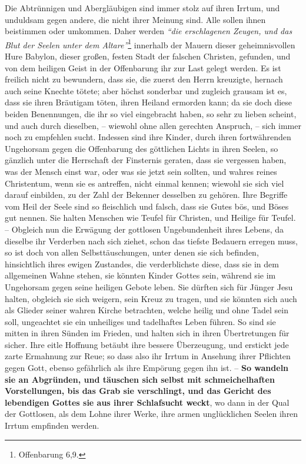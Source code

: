 Die Abtrünnigen und Abergläubigen sind immer stolz auf ihren Irrtum, und
unduldsam gegen andere, die nicht ihrer Meinung sind.
Alle sollen ihnen beistimmen oder umkommen.
Daher werden
\textit{"`die erschlagenen Zeugen, und das Blut der Seelen unter
dem Altare"'}\footnote{Offenbarung 6,9.}
innerhalb der Mauern dieser geheimnisvollen Hure Babylon, dieser großen, festen Stadt
der falschen Christen, gefunden, und von dem heiligen Geist in der Offenbarung
ihr zur Last gelegt werden.
Es ist freilich nicht zu bewundern, dass sie, die zuerst den Herrn kreuzigte,
hernach auch seine Knechte tötete;
aber höchst sonderbar und zugleich grausam ist es, dass sie ihren Bräutigam
töten, ihren Heiland ermorden kann;
da sie doch diese beiden Benennungen, die ihr so viel eingebracht haben, so sehr
zu lieben scheint, und auch durch dieselben,
-- wiewohl ohne allen gerechten Anspruch, --
sich immer noch zu empfehlen sucht.
Indessen sind ihre Kinder, durch ihren fortwährenden Ungehorsam gegen die
Offenbarung des göttlichen Lichts in ihren Seelen, so gänzlich unter die
Herrschaft der Finsternis geraten, dass sie vergessen haben, was der Mensch
einst war, oder was sie jetzt sein sollten, und wahres reines Christentum, wenn
sie es antreffen, nicht einmal kennen;
wiewohl sie sich viel darauf einbilden, zu der Zahl der Bekenner desselben zu
gehören.
Ihre Begriffe vom Heil der Seele sind so fleischlich und falsch, dass sie Gutes
bös, und Böses gut nennen.
Sie halten Menschen wie Teufel für Christen, und Heilige für Teufel.
-- Obgleich nun die Erwägung der gottlosen Ungebundenheit ihres Lebens, da
dieselbe ihr Verderben nach sich ziehet, schon das tiefste Bedauern erregen muss,
so ist doch von allen Selbsttäuschungen, unter denen sie sich befinden,
hinsichtlich ihres ewigen Zustandes, die verderblichste diese, dass sie in dem
allgemeinen Wahne stehen, sie könnten Kinder Gottes sein, während sie im
Ungehorsam gegen seine heiligen Gebote leben.
Sie dürften sich für Jünger Jesu halten, obgleich sie sich weigern, sein Kreuz
zu tragen, und sie könnten sich auch als Glieder seiner wahren Kirche
betrachten, welche heilig und ohne Tadel sein soll, ungeachtet sie ein
unheiliges und tadelhaftes Leben führen.
So sind sie mitten in ihren Sünden im Frieden, und halten sich in ihren
Übertretungen für sicher.
Ihre eitle Hoffnung betäubt ihre bessere Überzeugung, und erstickt jede zarte
Ermahnung zur Reue;
so dass also ihr Irrtum in Ansehung ihrer Pflichten gegen Gott, ebenso
gefährlich als ihre Empörung gegen ihn ist. \label{ref:01_07_selbstbetrug}
-- \textbf{So wandeln sie an Abgründen, und täuschen sich selbst mit
schmeichelhaften Vorstellungen, bis das Grab sie verschlingt, und das
Gericht des lebendigen
Gottes sie aus ihrer Schlafsucht weckt}, wo dann in der Qual der Gottlosen, als
dem Lohne ihrer Werke, ihre armen unglücklichen Seelen ihren Irrtum empfinden
werden.

